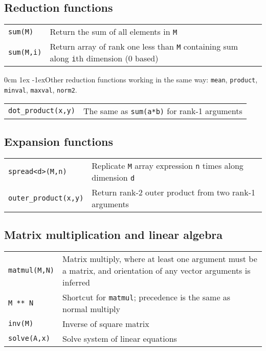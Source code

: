\documentclass[10pt,a4,landscape]{article}
\def\hangingpar{\parshape 2 0cm \linewidth 1ex \dimexpr\linewidth-1ex\relax}
\def\code#1{\texttt{#1}}
\begin{document}
\subsection*{Reduction functions}
\begin{tabular}{ll}
\code{sum(M)} & Return the sum of all elements in \code{M}\\
\code{sum(M,i)} & Return array of rank one less than \code{M} containing sum along \code{i}th dimension (0 based)\\
\end{tabular}

\hangingpar Other reduction functions working in the same way:
\code{mean}, \code{product}, \code{minval}, \code{maxval}, \code{norm2}.

\begin{tabular}{ll}
\code{dot\_product(x,y)} & The same as \code{sum(a*b)} for rank-1
arguments\\
\end{tabular}
\subsection*{Expansion functions}
\begin{tabular}{ll}
\code{spread<d>(M,n)} & Replicate \code{M} array expression \code{n}
times along dimension \code{d}\\
\code{outer\_product(x,y)} & Return rank-2 outer product from two
rank-1 arguments\\
\end{tabular}
\subsection*{Matrix multiplication and linear algebra}
\begin{tabular}{ll}
\code{matmul(M,N)} & Matrix multiply, where at least one argument must
be a matrix, and orientation of any vector arguments is inferred\\
\code{M ** N} & Shortcut for \code{matmul}; precedence is the same as normal
  multiply\\
\code{inv(M)} & Inverse of square matrix\\
\code{solve(A,x)} & Solve system of linear equations\\ 
\end{tabular}
\end{document}
